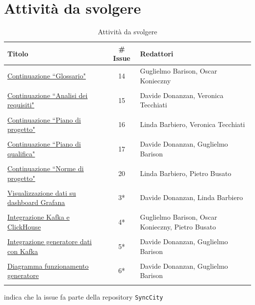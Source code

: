 \documentclass[8pt]{article}
\begin{document}
\section{Attività da svolgere}
\begin{table}[ht!]
	\centering
	\begin{tabular}{p{7cm}cp{7cm}}
		\toprule
		\textbf{Titolo} & \textbf{\# Issue} & \textbf{Redattori} \\
		\midrule
		\href{https://github.com/NaN1fy/docs/issues/14}{\underline{Continuazione ``Glossario"}} & 14 & Guglielmo Barison, Oscar Konieczny\\\\
		\href{https://github.com/NaN1fy/docs/issues/15}{\underline{Continuazione ``Analisi dei requisiti"}} & 15 & Davide Donanzan, Veronica Tecchiati\\\\
		\href{https://github.com/NaN1fy/docs/issues/16}{\underline{Continuazione ``Piano di progetto"}} & 16 & Linda Barbiero, Veronica Tecchiati\\\\
		\href{https://github.com/NaN1fy/docs/issues/17}{\underline{Continuazione ``Piano di qualifica"}} & 17 & Davide Donanzan, Guglielmo Barison\\\\
		\href{https://github.com/NaN1fy/docs/issues/20}{\underline{Continuazione ``Norme di progetto"}} & 20 & Linda Barbiero, Pietro Busato\\\\
		\href{https://github.com/NaN1fy/SyncCity/issues/3}{\underline{Visualizzazione dati su dashboard Grafana}} & 3*\tnote{*} & Davide Donanzan, Linda Barbiero\\\\
		\href{https://github.com/NaN1fy/SyncCity/issues/4}{\underline{Integrazione Kafka e ClickHouse}} & 4*\tnote{*} & Guglielmo Barison, Oscar Konieczny, Pietro Busato\\\\
		\href{https://github.com/NaN1fy/SyncCity/issues/5}{\underline{Integrazione generatore dati con Kafka}} & 5*\tnote{*} & Davide Donanzan, Guglielmo Barison\\\\
		\href{https://github.com/NaN1fy/SyncCity/issues/6}{\underline{Diagramma funzionamento generatore}} & 6*\tnote{*} & Davide Donanzan, Guglielmo Barison\\\\
		\bottomrule
	\end{tabular}
	\begin{tablenotes}
		\vspace{1em}
		\item * indica che la issue fa parte della repository \texttt{SyncCity}
	\end{tablenotes}
	\caption{Attività da svolgere}
	\label{table:Attivita da svolgere}
\end{table}
\end{document}
